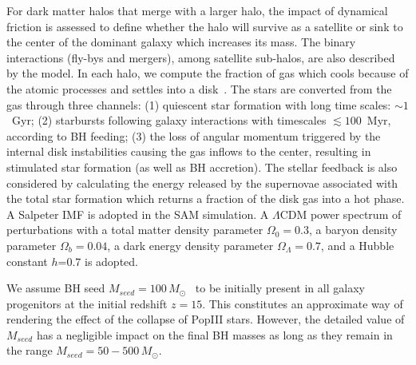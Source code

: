 \documentclass[twocolumn]{aastex631}
\begin{document}
For dark matter halos that merge with a larger halo, the impact of dynamical friction is assessed to define whether the halo will survive as a satellite or sink to the center of the dominant galaxy which increases its mass. The binary interactions (fly-bys and mergers), among satellite sub-halos, are  also described by the model. In each halo, we compute the fraction of gas which cools because of the atomic processes and settles into a disk~\citep{Mo1998}. The stars are converted from the gas through three channels: (1) quiescent star formation with long time scales: $\sim1$~Gyr; (2) starbursts following galaxy interactions with timescales $\lesssim 100$~Myr, according to BH feeding; (3) the loss of angular momentum triggered by the internal disk instabilities causing the gas inflows to the center, resulting in stimulated star formation (as well as BH accretion). The stellar feedback is also considered by calculating the energy released by the supernovae associated with the total star formation which returns a fraction of the disk gas into a hot phase. A Salpeter IMF is adopted in the SAM simulation. A $\Lambda$CDM power spectrum of perturbations with a total matter density parameter $\Omega_0=0.3$, a baryon density parameter 
$\Omega_b=0.04$, a dark energy density parameter $\Omega_\Lambda=0.7$, and a Hubble constant $h$=0.7 is adopted.

{We assume BH seed $M_{seed}=100\,M_{\odot}$~\citep{Madau2001}  to be initially present in all galaxy progenitors at the initial redshift $z=15$. This constitutes an approximate way of rendering the effect of the collapse of PopIII stars. However, the detailed value of $M_{seed}$ has a negligible impact on the final BH masses as long as they remain in the range $M_{seed}=50-500\,M_{\odot}$.
}
\end{document}
